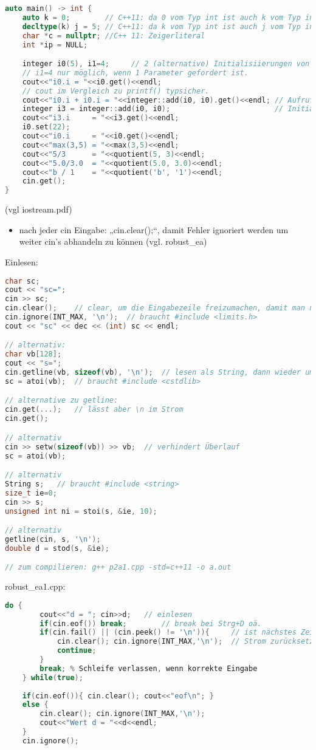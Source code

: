 \begin{lstlisting}[language=C++]
auto main() -> int {
	auto k = 0;        // C++11: da 0 vom Typ int ist auch k vom Typ int
	decltype(k) j = 5; // C++11: da k vom Typ int ist auch j vom Typ int
	char *c = nullptr; //C++ 11: Zeigerliteral
	int *ip = NULL;

	integer i0(5), i1=4;     // 2 (alternative) Initialisiierungen von Objekten
	// i1=4 nur möglich, wenn 1 Parameter gefordert ist.
	cout<<"i0.i = "<<i0.get()<<endl;
	// cout im Vergleich zu printf() typsicher.
	cout<<"i0.i + i0.i = "<<integer::add(i0, i0).get()<<endl; // Aufruf static-Methode add
	integer i3 = integer::add(i0, i0);                        // Initialisierung von i3
	cout<<"i3.i     = "<<i3.get()<<endl;
	i0.set(22);
	cout<<"i0.i     = "<<i0.get()<<endl;
	cout<<"max(3,5) = "<<max(3,5)<<endl;
	cout<<"5/3      = "<<quotient(5, 3)<<endl;
	cout<<"5.0/3.0  = "<<quotient(5.0, 3.0)<<endl;
	cout<<"b / 1    = "<<quotient('b', '1')<<endl;
	cin.get();
}
\end{lstlisting}

(vgl iostream.pdf)
\begin{itemize}
\item nach jeder cin Eingabe: „cin.clear();“, damit Fehler ignoriert werden um weiter cin's abhandeln zu können (vgl. robust\_ea)
\end{itemize}
Einlesen:
\begin{lstlisting}[language=C++]
char sc;
cout << "sc=";
cin >> sc;
cin.clear();	// clear, um die Eingabezeile freizumachen, damit man nicht an Falscher Eingabe hängen bleibt
cin.ignore(INT_MAX, '\n');	// braucht #include <limits.h>
cout << "sc" << dec << (int) sc << endl;

// alternativ:
char vb[128];
cout << "s=";
cin.getline(vb, sizeof(vb), '\n');	// lesen als String, dann wieder umwandeln (liest auch Leerzeichen ein)
sc = atoi(vb);	// braucht #include <cstdlib>

// alternative zu getline:
cin.get(...);	// lässt aber \n im Strom
cin.get();

// alternativ
cin >> setw(sizeof(vb)) >> vb;	// verhindert Überlauf
sc = atoi(vb);

// alternativ
String s;	// braucht #include <string>
size_t ie=0;
cin >> s;
unsigned int ni = stoi(s, &ie, 10);

// alternativ
getline(cin, s, '\n');
double d = stod(s, &ie);

// zum compilieren: g++ p2a1.cpp -std=c++11 -o a.out
\end{lstlisting}

robust\_ea1.cpp:
\begin{lstlisting}[language=C++]
	do {
		cout<<"d = "; cin>>d; 	// einlesen
		if(cin.eof()) break;		// break bei Strg+D oä.
		if(cin.fail() || (cin.peek() != '\n')){		// ist nächstes Zeichen ungültig?
			cin.clear(); cin.ignore(INT_MAX,'\n');	// Strom zurücksetzen und zum \n gehen
			continue;
		}
		break; % Schleife verlassen, wenn korrekte Eingabe
	} while(true);
	
	if(cin.eof()){ cin.clear(); cout<<"eof\n"; }
	else {
		cin.clear(); cin.ignore(INT_MAX,'\n');
		cout<<"Wert d = "<<d<<endl;
	}
	cin.ignore();
\end{lstlisting}

